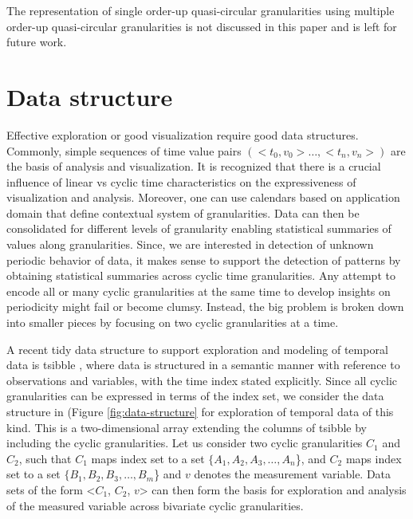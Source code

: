 \documentclass[12pt]{article}
\begin{document}
The representation of single order-up quasi-circular granularities using multiple order-up quasi-circular granularities is not discussed in this paper and is left for future work.

\hypertarget{sec:data-structure}{%
\section{Data structure}\label{sec:data-structure}}

Effective exploration or good visualization require good data structures. Commonly, simple sequences of time value pairs \((<t_0, v_0> \dots, <t_n, v_n>)\) are the basis of analysis and visualization. It is recognized that there is a crucial influence of linear vs cyclic time characteristics on the expressiveness of visualization and analysis. Moreover, one can use calendars based on application domain that define contextual system of granularities. Data can then be consolidated for different levels of granularity enabling statistical summaries of values along granularities. Since, we are interested in detection of unknown periodic behavior of data, it makes sense to support the detection of patterns by obtaining statistical summaries across cyclic time granularities. Any attempt to encode all or many cyclic granularities at the same time to develop insights on periodicity might fail or become clumsy. Instead, the big problem is broken down into smaller pieces by focusing on two cyclic granularities at a time.

A recent tidy data structure to support exploration and modeling of temporal data is tsibble \citep{wang2019tsibble}, where data is structured in a semantic manner with reference to observations and variables, with the time index stated explicitly. Since all cyclic granularities can be expressed in terms of the index set, we consider the data structure in (Figure \ref{fig:data-structure} for exploration of temporal data of this kind. This is a two-dimensional array extending the columns of tsibble by including the cyclic granularities. Let us consider two cyclic granularities \(C_1\) and \(C_2\), such that \(C_1\) maps index set to a set \(\{A_1, A_2, A_3, \dots, A_n\)\}, and \(C_2\) maps index set to a set \(\{B_1, B_2, B_3, \dots, B_m\)\} and \(v\) denotes the measurement variable. Data sets of the form \textless{}\(C_1\), \(C_2\), \(v\)\textgreater{} can then form the basis for exploration and analysis of the measured variable across bivariate cyclic granularities.
\end{document}
